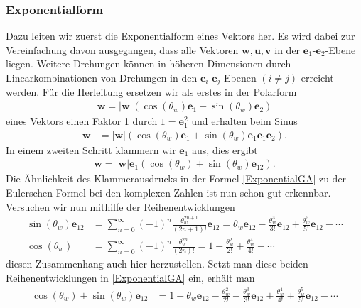 \subsubsection{Exponentialform}
Dazu leiten wir zuerst die Exponentialform eines Vektors her. Es wird dabei zur Vereinfachung davon ausgegangen, dass alle Vektoren $\mathbf{w}, \mathbf{u}, \mathbf{v}$ in der $\mathbf{e}_{1}$-$\mathbf{e}_{2}$-Ebene liegen. Weitere Drehungen können in höheren Dimensionen durch Linearkombinationen von Drehungen in den $\mathbf{e}_{i}$-$\mathbf{e}_{j}$-Ebenen $(i\not=j)$ erreicht werden. Für die Herleitung ersetzen wir als erstes in der Polarform
\begin{align}
	\mathbf{w} = |\mathbf{w}| \left(\cos(\theta_w) \mathbf{e}_1 + \sin(\theta_w) \mathbf{e}_2\right)
\end{align}
eines Vektors einen Faktor 1 durch $1=\mathbf{e}_1^2$ und erhalten beim Sinus
\begin{align}\label{e1ausklammern}
	\mathbf{w} &= |\mathbf{w}| \left(\cos(\theta_w) \mathbf{e}_1 + \sin(\theta_w) \mathbf{e}_1\mathbf{e}_1\mathbf{e}_2\right). 
\end{align}
In einem zweiten Schritt klammern wir $\mathbf{e}_1$ aus, dies ergibt
\begin{align}
	\mathbf{w} = |\mathbf{w}|\mathbf{e}_1\left(\cos(\theta_w)+ \sin(\theta_w) \mathbf{e}_{12}\right). \label{ExponentialGA}
\end{align}
Die Ähnlichkeit des Klammerausdrucks in der Formel \eqref{ExponentialGA} zu der Eulerschen Formel bei den komplexen Zahlen ist nun schon gut erkennbar. Versuchen wir nun mithilfe der Reihenentwicklungen
\begin{align}
	\sin(\theta_w)\mathbf{e}_{12}&=\sum _{n=0}^{\infty }(-1)^{n}{\frac {\theta_w^{2n+1}}{(2n+1)!}}\mathbf{e}_{12} =\theta_w\mathbf{e}_{12}-{\frac {\theta_w^{3}}{3!}}\mathbf{e}_{12}+{\frac {\theta_w^{5}}{5!}}\mathbf{e}_{12}-\cdots \\
	\cos(\theta_w)&=\sum _{n=0}^{\infty }(-1)^{n}{\frac {\theta_w^{2n}}{(2n)!}} =1-{\frac {\theta_w^{2}}{2!}}+{\frac {\theta_w^{4}}{4!}}-\cdots
\end{align}
diesen Zusammenhang auch hier herzustellen. Setzt man diese beiden Reihenentwicklungen in \eqref{ExponentialGA} ein, erhält man
\begin{align}
	\cos(\theta_w)+ \sin(\theta_w) \mathbf{e}_{12} &= 1+\theta_w\mathbf{e}_{12}-{\frac {\theta_w^{2}}{2!}}-{\frac {\theta_w^{3}}{3!}}\mathbf{e}_{12}+{\frac {\theta_w^{4}}{4!}}+{\frac {\theta_w^{5}}{5!}}\mathbf{e}_{12}-\cdots
\end{align}
